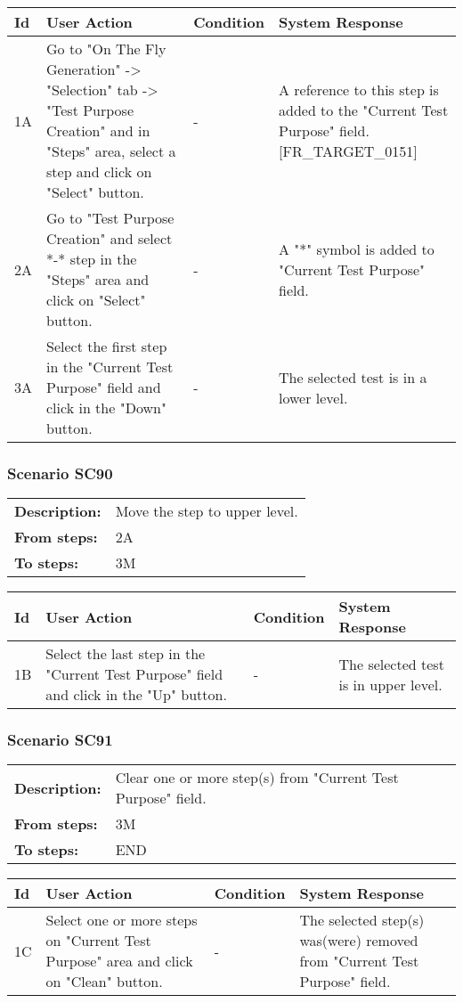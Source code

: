 \documentclass[a4paper,11pt]{article}
\newcommand{\bl}{\\ \hline}
\begin{document}
\begin{tabular}{|p{0.8in}|p{1.6in}|p{1.6in}|p{1.6in}|}
\hline
Id & User Action & Condition & System Response  \bl 
1A & Go to "On The Fly Generation" -> "Selection" tab ->
						"Test Purpose Creation" and in "Steps" area, select a step and
						click on "Select" button. & - & A reference to this step is added to the "Current Test
						Purpose" field. [FR_TARGET_0151] \bl 
2A & Go to "Test Purpose Creation" and select *-* step in the
						"Steps" area and click on "Select" button.    & - & A "*" symbol is added to "Current Test Purpose" field.
					 \bl 
3A & Select the first step in the "Current Test Purpose" field
						and click in the "Down" button. & - & The selected test is in a lower level.  \bl 
\end{tabular}
\subsubsection*{Scenario SC90}
\begin{tabular}{p{1in}p{4in}}
{\bf Description:} & Move the step to upper level. \\
{\bf From steps:} & 2A \\
{\bf To steps:} & 3M \\
\end{tabular}
 
\begin{tabular}{|p{0.8in}|p{1.6in}|p{1.6in}|p{1.6in}|}
\hline
Id & User Action & Condition & System Response  \bl 
1B & Select the last step in the "Current Test Purpose" field
						and click in the "Up" button. & - & The selected test is in upper level. \bl 
\end{tabular}
\subsubsection*{Scenario SC91}
\begin{tabular}{p{1in}p{4in}}
{\bf Description:} & Clear one or more step(s) from "Current Test Purpose"
					field. \\
{\bf From steps:} & 3M \\
{\bf To steps:} & END \\
\end{tabular}
 
\begin{tabular}{|p{0.8in}|p{1.6in}|p{1.6in}|p{1.6in}|}
\hline
Id & User Action & Condition & System Response  \bl 
1C & Select one or more steps on "Current Test Purpose" area and
						click on "Clean" button.  & - & The selected step(s) was(were) removed from "Current Test
						Purpose" field.  \bl 
\end{tabular}
\end{document}

